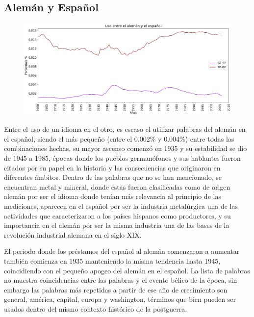 \newpage
\subsection{Alemán y Español}

\begin{figure}[h!]
	\centering
	\includegraphics[scale=.38]{Cap_4/SF_4_S2_GE.png}
	\label{SF_GS}
	\caption{}
\end{figure}

Entre el uso de un idioma en el otro,  es escaso el utilizar palabras del alemán en el español, siendo el más pequeño  (entre el 0.002$\%$ y 0.004$\%$) entre todas las combinaciones hechas, su mayor ascenso comenzó en 1935 y su estabilidad se dio de 1945 a 1985,  épocas donde los pueblos germanófonos y sus hablantes  fueron citados por su papel en la historia y las consecuencias que originaron en diferentes ámbitos.  Dentro de las palabras que no se han mencionado, se encuentran metal y mineral,  donde estas fueron clasificadas como de origen alemán por ser el idioma donde tenían más relevancia al principio de las mediciones, aparecen en el español  por ser  la industria metalúrgica una de las actividades que caracterizaron a los países hispanos como productores, y su importancia en el alemán por ser la misma industria una de las bases de la revolución industrial alemana en el siglo XIX. 

El periodo donde los préstamos del español al alemán comenzaron a aumentar también comienza en 1935  manteniendo la misma tendencia hasta 1945,  coincidiendo con el pequeño apogeo del alemán en el español.  La lista de palabras no muestra coincidencias entre las palabras y el evento bélico de la época, sin embargo las palabras más repetidas a partir de ese año de crecimiento son  general, américa, capital, europa y washington, términos que bien pueden ser usados dentro del mismo contexto histórico de la postguerra. 



